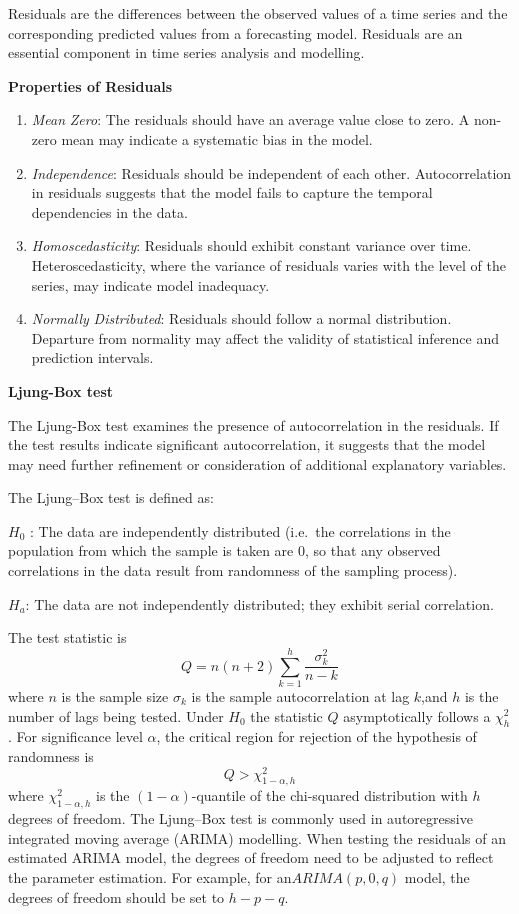 \documentclass[
]{article}
\begin{document}
Residuals are the differences between the observed values of a time
series and the corresponding predicted values from a forecasting model.
Residuals are an essential component in time series analysis and
modelling.

\textbf{Properties of Residuals}

\begin{enumerate}
\def\labelenumi{\arabic{enumi}.}
\item
  \emph{Mean} \emph{Zero}: The residuals should have an average value
  close to zero. A non-zero mean may indicate a systematic bias in the
  model.
\item
  \emph{Independence}: Residuals should be independent of each other.
  Autocorrelation in residuals suggests that the model fails to capture
  the temporal dependencies in the data.
\item
  \emph{Homoscedasticity}: Residuals should exhibit constant variance
  over time. Heteroscedasticity, where the variance of residuals varies
  with the level of the series, may indicate model inadequacy.
\item
  \emph{Normally} \emph{Distributed}: Residuals should follow a normal
  distribution. Departure from normality may affect the validity of
  statistical inference and prediction intervals.
\end{enumerate}

\textbf{Ljung-Box test}

The Ljung-Box test examines the presence of autocorrelation in the
residuals. If the test results indicate significant autocorrelation, it
suggests that the model may need further refinement or consideration of
additional explanatory variables.

The Ljung--Box test is defined as:

\(H_0\) : The data are independently distributed (i.e.~the correlations
in the population from which the sample is taken are 0, so that any
observed correlations in the data result from randomness of the sampling
process).

\(H_a\): The data are not independently distributed; they exhibit serial
correlation.

The test statistic is
\[Q=n(n+2) \sum_{k=1}^{h}{\frac{\sigma_k^2}{n-k}}\] where \(n\) is the
sample size \(\sigma_k\) is the sample autocorrelation at lag \(k\),and
\(h\) is the number of lags being tested. Under \(H_0\) the statistic
\(Q\) asymptotically follows a \(χ^{2}_{h}\). For significance level
\(\alpha\), the critical region for rejection of the hypothesis of
randomness is \[Q>\chi^2_{1-\alpha,h}\] where \(\chi^2_{1-\alpha,h}\) is
the \((1 − \alpha)\)-quantile of the chi-squared distribution with \(h\)
degrees of freedom. The Ljung--Box test is commonly used in
autoregressive integrated moving average (ARIMA) modelling. When testing
the residuals of an estimated ARIMA model, the degrees of freedom need
to be adjusted to reflect the parameter estimation. For example, for
an\(ARIMA(p, 0, q)\) model, the degrees of freedom should be set to
\(h-p-q\).
\end{document}

